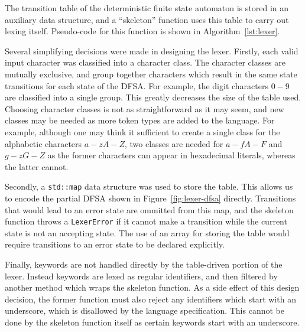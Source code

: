 \documentclass[11pt,a4paper]{scrartcl}
\begin{document}
The transition table of the deterministic finite state automaton is stored in an auxiliary data structure, and a ``skeleton'' function uses this table to carry out lexing itself. Pseudo-code for this function is shown in Algorithm~\ref{lst:lexer}.




Several simplifying decisions were made in designing the lexer. Firstly, each valid input character was classified into a character class. The character classes are mutually exclusive, and group together characters which result in the same state transitions for each state of the DFSA. For example, the digit characters $0-9$ are classified into a single group. This greatly decreases the size of the table used. Choosing character classes is not as straightforward as it may seem, and new classes may be needed as more token types are added to the language. For example, although one may think it sufficient to create a single class for the alphabetic characters $a-zA-Z$, two classes are needed for $a-fA-F$ and $g-zG-Z$ as the former characters can appear in hexadecimal literals, whereas the latter cannot.

Secondly, a \verb!std::map! data structure was used to store the table. This allows us to encode the partial DFSA shown in Figure~\ref{fig:lexer-dfsa} directly. Transitions that would lead to an error state are ommitted from this map, and the skeleton function throws a \verb!LexerError! if it cannot make a transition while the current state is not an accepting state. The use of an array for storing the table would require transitions to an error state to be declared explicitly.

Finally, keywords are not handled directly by the table-driven portion of the lexer. Instead keywords are lexed as regular identifiers, and then filtered by another method which wraps the skeleton function. As a side effect of this design decision, the former function must also reject any identifiers which start with an underscore, which is disallowed by the language specification. This cannot be done by the skeleton function itself as certain keywords start with an underscore.
\end{document}
